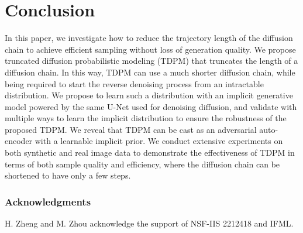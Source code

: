 \documentclass{article} \usepackage{iclr2023_conference,times}
\theoremstyle{plain}
\theoremstyle{definition}
\theoremstyle{remark}
\begin{document}
{  



\section{Conclusion}In this paper, we investigate how to reduce the trajectory length of the diffusion chain to achieve efficient sampling without loss of generation quality. We propose truncated diffusion probabilistic modeling (TDPM) that truncates the length of a diffusion chain. In this way, TDPM can use a much shorter diffusion chain, while being required to start the reverse denoising process from an intractable distribution. We propose to learn such a distribution with an implicit generative model powered by the same U-Net used for denoising diffusion, and validate with multiple ways to learn the implicit distribution to ensure the robustness of the proposed TDPM. We reveal that TDPM can be cast as an adversarial auto-encoder with a learnable implicit prior. We conduct extensive experiments on both synthetic  and real image data to demonstrate the effectiveness of TDPM in terms of both sample quality and efficiency, where the diffusion chain can be shortened to have only a few steps.

\subsubsection*{Acknowledgments}
H. Zheng and M. Zhou acknowledge the support of NSF-IIS 2212418 and IFML. 






\newpage
\appendix
}
\end{document}
